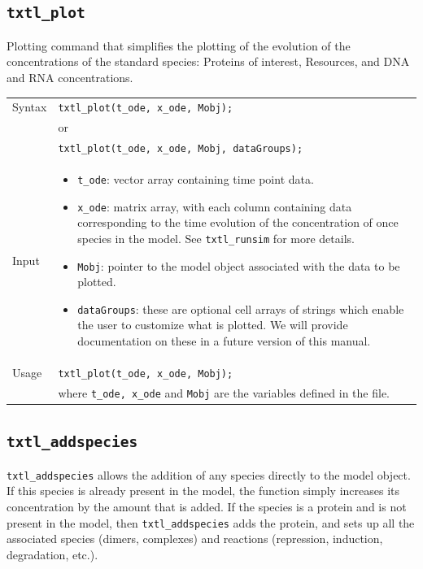 \documentclass[english]{report}
\begin{document}
		\subsection*{\texttt{txtl\_plot}}
		Plotting command that simplifies the plotting of the evolution of the concentrations of the standard species: Proteins of interest, Resources, and DNA and RNA concentrations. \\
		
		\begin{tabular}{p{2cm}|p{13cm}}
			Syntax & \texttt{txtl\_plot(t\_ode, x\_ode, Mobj);}\\
			& or \\
			& \texttt{txtl\_plot(t\_ode, x\_ode, Mobj, dataGroups);}\\		 \hline
			Input &  \begin{itemize}
				\item \texttt{t\_ode}: vector array containing time point data. 
				\item \texttt{x\_ode}: matrix array, with each column containing data corresponding to the time evolution of the concentration of once species in the model. See \texttt{txtl\_runsim} for more details.  
				\item \texttt{Mobj}: pointer to the model object associated with the data to be plotted.
				\item \texttt{dataGroups}: these are optional cell arrays of strings which enable the user to customize what is plotted. We will provide documentation on these in a future version of this manual.  
				\end{itemize} \\ \hline
			Usage & \texttt{txtl\_plot(t\_ode, x\_ode, Mobj);}\\
			& where \texttt{t\_ode, x\_ode} and \texttt{Mobj} are the variables defined in the file. 
			\end{tabular}
		
		
		\subsection*{\texttt{txtl\_addspecies}}
			\texttt{txtl\_addspecies} allows the addition of any species directly to the model object. If this species is already present in the model, the function simply increases its concentration by the amount that is added. If the species is a protein and is not present in the model, then \texttt{txtl\_addspecies} adds the protein, and sets up all the associated species (dimers, complexes) and reactions (repression, induction, degradation, etc.). \\
			
\end{document}
